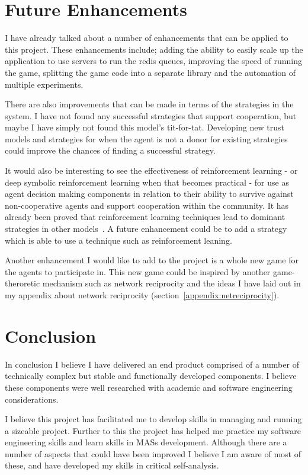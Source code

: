 \documentclass[]{final_report}
\begin{document}
\section{Future Enhancements}
I have already talked about a number of enhancements that can be applied to this project. These enhancements include; adding the ability to easily scale up the application to use servers to run the redis queues, improving the speed of running the game, splitting the game code into a separate library and the automation of multiple experiments.\par 
There are also improvements that can be made in terms of the strategies in the system. I have not found any successful strategies that support cooperation, but maybe I have simply not found this model's tit-for-tat. Developing new trust models and strategies for when the agent is not a donor for existing strategies could improve  the chances of finding a successful strategy.\par 
It would also be interesting to see the effectiveness of reinforcement learning - or deep symbolic reinforcement learning when that becomes practical - for use as agent decision making components in relation to their ability to survive against non-cooperative agents and support cooperation within the community. It has already been proved that reinforcement learning techniques lead to dominant strategies in other models~\cite{harper2017reinforcement}. A future enhancement could be to add a strategy which is able to use a technique such as reinforcement leaning.\par 
Another enhancement I would like to add to the project is a whole new game for the agents to participate in. This new game could be inspired by another game-theroretic mechanism such as network reciprocity and the ideas I have laid out in my appendix about network reciprocity (section~\ref{appendix:netreciprocity}).

\section{Conclusion}
In conclusion I believe I have delivered an end product comprised of a number of technically complex but stable and functionally developed components. I believe these components were well researched with academic and software engineering considerations.\par 
I believe this project has facilitated me to develop skills in managing and running a sizeable project. Further to this the project has helped me practice my software engineering skills and learn skills in MASs development. Although there are a number of aspects that could have been improved I believe I am aware of most of these, and have developed my skills in critical self-analysis.
\end{document}
